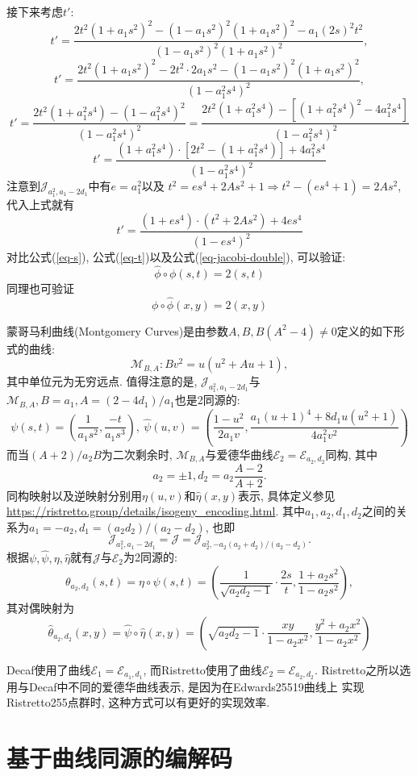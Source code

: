 \documentclass{article}
\newcommand{\E}{\mathcal{E}}
\newcommand{\M}{\mathcal{M}}
\newcommand{\J}{\mathcal{J}}
\begin{document}
接下来考虑$t'$:
$$
t' = 
\frac{2t^2(1+a_1s^2)^2 -(1-a_1s^2)^2(1+a_1s^2)^2 - a_1(2s)^2t^2}{(1-a_1s^2)^2(1+a_1s^2)^2},
$$
$$
t' = 
\frac{2t^2(1+a_1s^2)^2 - 2t^2\cdot 2a_1s^2 - (1-a_1s^2)^2(1+a_1s^2)^2}{(1-a_1^2s^4)^2},
$$
$$
t' = 
\frac{2t^2(1+a_1^2s^4) -  (1-a_1^2s^4)^2}{(1-a_1^2s^4)^2} = 
\frac{2t^2(1+a_1^2s^4) -  [(1+a_1^2s^4)^2 - 4a_1^2s^4]}{(1-a_1^2s^4)^2}
$$
\begin{equation}\label{eq-t}
t' = \frac{(1+a_1^2s^4)\cdot \left[2t^2 -  (1+a_1^2s^4)\right] + 4a_1^2s^4}{(1-a_1^2s^4)^2}
\end{equation}
注意到$\J_{a_1^2, a_1-2d_1}$中有$e = a_1^2$以及
$t^2 = es^4 + 2As^2 + 1 \Rightarrow t^2 - (es^4 + 1) = 2As^2$, 代入上式就有
$$
t' = \frac{(1+es^4)\cdot (t^2 +  2As^2) + 4es^4}{(1-es^4)^2}
$$
对比公式(\ref{eq-s}), 公式(\ref{eq-t})以及公式(\ref{eq-jacobi-double}), 可以验证:
$$
\hat{\phi}\circ\phi(s,t) = 2(s,t)
$$
同理也可验证
$$
\phi\circ\hat{\phi}(x,y) = 2(x,y)
$$

蒙哥马利曲线(Montgomery Curves)是由参数$A,B, B(A^2-4)\neq 0$定义的如下形式的曲线:
$$
\M_{B,A}: Bv^2 = u(u^2 + Au + 1),
$$
其中单位元为无穷远点. 
值得注意的是, $\J_{a_1^2, a_1-2d_1}$与$\M_{B,A}, B = a_1, A = (2-4d_1) / a_1$也是2同源的:
$$
\psi(s,t)  = \left(\frac{1}{a_1s^2}, \frac{-t}{a_1s^3}\right), \ 
\hat{\psi}(u,v) = \left( \frac{1-u^2}{2a_1v}, \frac{a_1(u+1)^4+8d_1u(u^2+1)}{4a_1^2v^2} \right)
$$
而当$(A+2)/a_2B$为二次剩余时, $\M_{B,A}$与爱德华曲线$\E_2 = \E_{a_2,d_2}$同构,
其中
$$a_2 = \pm 1, d_2 = a_2\frac{A-2}{A+2}.$$
同构映射以及逆映射分别用$\eta(u,v)$和$\hat{\eta}(x,y)$表示, 具体定义参见
\url{https://ristretto.group/details/isogeny_encoding.html}.
其中$a_1, a_2, d_1, d_2$之间的关系为$a_1 = -a_2, d_1 = (a_2d_2)/(a_2-d_2)$,
也即
$$\J_{a_1^2, a_1-2d_1} = \J = \J_{a_2^2, -a_2(a_2+d_2) / (a_2-d_2)}.$$
根据$\psi, \hat{\psi}, \eta, \hat{\eta}$就有$\J$与$\E_2$为2同源的:
$$
\theta_{a_2,d_2}(s,t) = \eta\circ\psi(s,t) = \left( \frac{1}{\sqrt{a_2d_2-1}}\cdot\frac{2s}{t}, \frac{1+a_2s^2}{1-a_2s^2}\right),
$$
其对偶映射为
$$
\hat{\theta}_{a_2,d_2}(x,y) =\hat{\psi}\circ  \hat{\eta}(x,y) = \left(
\sqrt{a_2d_2-1}\cdot\frac{xy}{1-a_2x^2}, 
\frac{y^2 + a_2x^2}{1 - a_2x^2}
\right)
$$

Decaf使用了曲线$\E_1 = \E_{a_1, d_1}$, 而Ristretto使用了曲线$\E_2 = \E_{a_2,d_2}$.
Ristretto之所以选用与Decaf中不同的爱德华曲线表示, 是因为在Edwards25519曲线上
实现Ristretto255点群时, 这种方式可以有更好的实现效率.

\section{基于曲线同源的编解码}
\end{document}
